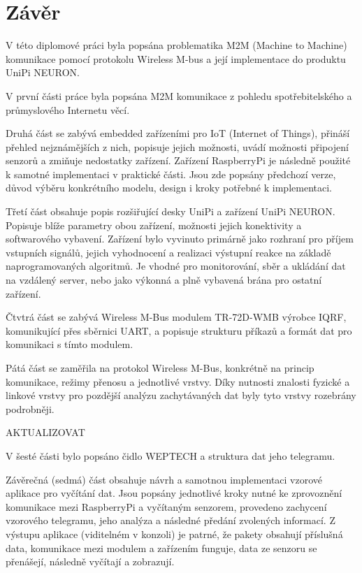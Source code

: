 \chapter{Závěr}

V této diplomové práci byla popsána problematika M2M (Machine to Machine) komunikace pomocí protokolu Wireless M-bus a její implementace do produktu UniPi NEURON.


V první části práce byla popsána M2M komunikace z pohledu spotřebitelského a průmyslového Internetu věcí.

Druhá část se zabývá embedded zařízeními pro IoT (Internet of Things), přináší přehled nejznámějších z nich, popisuje jejich možnosti, uvádí možnosti připojení senzorů a zmiňuje nedostatky zařízení. Zařízení RaspberryPi je následně použité k samotné implementaci v praktické části. Jsou zde popsány předchozí verze, důvod výběru konkrétního modelu, design i kroky potřebné k implementaci.

Třetí část obsahuje popis rozšiřující desky UniPi a zařízení UniPi NEURON. Popisuje blíže parametry obou zařízení, možnosti jejich konektivity a softwarového vybavení. Zařízení bylo vyvinuto primárně jako rozhraní pro příjem vstupních signálů, jejich vyhodnocení a realizaci výstupní reakce na základě naprogramovaných algoritmů. Je vhodné pro monitorování, sběr a ukládání dat na vzdálený server, nebo jako výkonná a plně vybavená brána pro ostatní zařízení.

Čtvtrá část se zabývá Wireless M-Bus modulem TR-72D-WMB výrobce IQRF, komunikující přes sběrnici UART, a popisuje strukturu příkazů a formát dat pro komunikaci s tímto modulem.

Pátá část se zaměřila na protokol Wireless M-Bus, konkrétně na princip komunikace, režimy přenosu a jednotlivé vrstvy. 
Díky nutnosti znalosti fyzické a linkové vrstvy pro pozdější analýzu zachytávaných dat byly tyto vrstvy rozebrány podrobněji. 

\colorbox[rgb]{1,0,0}{AKTUALIZOVAT}

V šesté části bylo popsáno čidlo WEPTECH a struktura dat jeho telegramu.

Závěrečná (sedmá) část obsahuje návrh a samotnou implementaci vzorové aplikace pro vyčítání dat. Jsou popsány jednotlivé kroky nutné ke zprovoznění komunikace mezi RaspberryPi a vyčítaným senzorem, provedeno zachycení vzorového telegramu, jeho analýza a následné předání zvolených informací. Z výstupu aplikace (viditelném v konzoli) je patrné, že pakety obsahují příslušná data, komunikace mezi modulem a zařízením funguje, data ze senzoru se přenášejí, následně vyčítají a zobrazují.



